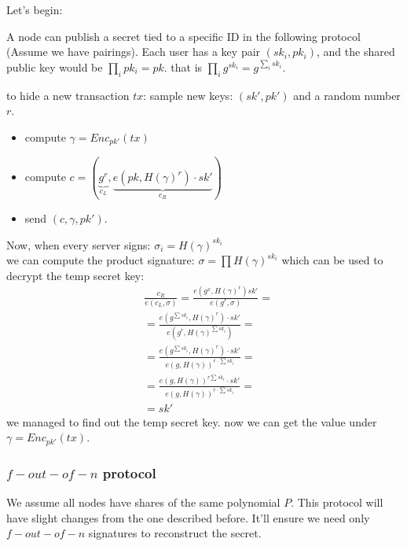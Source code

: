 Let's begin:


A node can publish a secret tied to a specific ID in the following protocol (Assume we have pairings).
Each user has a key pair $(sk_{i}, pk_{i})$, 
and the shared public key would be $\prod_{i}pk_{i}=pk$.
that is $\prod_{i}g^{sk_{i}}=g^{\sum_{i}sk_{i}}$.


to hide a new transaction $tx$: sample new keys: 
$\left(sk',pk'\right)$ and a random number $r$.
\begin{itemize}
\item compute $\gamma=Enc_{pk'}\left(tx\right)$
\item compute $c=\left(\underbrace{g^{r}}_{c_{L}},\underbrace{e\left(pk,H\left(\gamma\right)^{r}\right)\cdot sk'}_{c_{R}}\right)$ 
\item send $\left(c,\gamma,pk'\right)$.
\end{itemize}


Now, when every server signs: $\sigma_{i}=H\left(\gamma\right)^{sk_{i}}$\\
we can compute the product signature: $\sigma=\prod H\left(\gamma\right)^{sk_{i}}$
which can be used to decrypt the temp secret key: 
\begin{align*}
 & \frac{c_{R}}{e\left(c_{L},\sigma\right)}=\frac{e\left(g^{x},H\left(\gamma\right)^{r}\right)sk'}{e\left(g^{r},\sigma\right)}=\\
 & =\frac{e\left(g^{\sum sk_{i}},H\left(\gamma\right)^{r}\right)\cdot sk'}{e\left(g^{r},H\left(\gamma\right)^{\sum sk_{i}}\right)}=\\
 & =\frac{e\left(g^{\sum sk_{i}},H\left(\gamma\right)^{r}\right)\cdot sk'}{e\left(g,H\left(\gamma\right)\right)^{r\cdot\sum sk_{i}}}=\\
 & =\frac{e\left(g,H\left(\gamma\right)\right)^{r\sum sk_{i}}\cdot sk'}{e\left(g,H\left(\gamma\right)\right)^{r\cdot\sum sk_{i}}}=\\
 & =sk'
\end{align*}
 we managed to find out the temp secret key. now we can get the value
under $\gamma=Enc_{pk'}\left(tx\right)$.


\subsubsection*{$f-out-of-n$ protocol}
We assume all nodes have shares of the same polynomial $P$.
This protocol will have slight changes from the one described before.
It'll ensure we need only $f-out-of-n$ signatures to reconstruct the secret.


